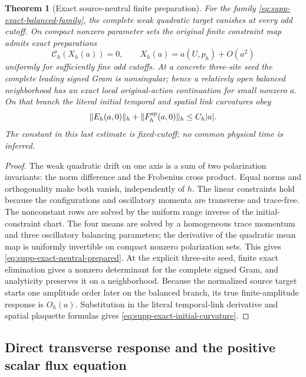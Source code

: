 \documentclass[11pt]{article}
\newtheorem{theorem}{Theorem}[section]
\numberwithin{equation}{section}
\theoremstyle{definition}
\theoremstyle{remark}
\begin{document}
\begin{theorem}[Exact source-neutral finite preparation]
\label{thm:supp-exact-neutral-preparation}
For the family \eqref{eq:supp-exact-balanced-family}, the complete weak
quadratic target vanishes at every odd cutoff.  On compact nonzero parameter
sets the original finite constraint map admits exact preparations
\begin{equation}
 \mathscr C_h(X_h(a))=0,
 \qquad X_h(a)=a(U,p_h)+O(a^2)
 \label{eq:supp-exact-neutral-prepared}
\end{equation}
uniformly for sufficiently fine odd cutoffs.  At a concrete three-site seed
the complete leading signed Gram is nonsingular; hence a relatively open
balanced neighborhood has an exact local original-action continuation for
small nonzero $a$.  On that branch the literal initial temporal and spatial
link curvatures obey
\begin{equation}
 \|E_h(a,0)\|_h+\|F_h^{\rm sp}(a,0)\|_h\le C_h|a|.
 \label{eq:supp-exact-initial-curvature}
\end{equation}
The constant in this last estimate is fixed-cutoff; no common physical time
is inferred.
\end{theorem}
\begin{proof}
The weak quadratic drift on one axis is a sum of two polarization invariants:
the norm difference and the Frobenius cross product.  Equal norms and
orthogonality make both vanish, independently of $h$.  The linear constraints
hold because the configurations and oscillatory momenta are transverse and
trace-free.  The nonconstant rows are solved by the uniform range inverse of
the initial-constraint chart.  The four means are solved by a homogeneous
trace momentum and three oscillatory balancing parameters; the derivative of
the quadratic mean map is uniformly invertible on compact nonzero
polarization sets.  This gives \eqref{eq:supp-exact-neutral-prepared}.  At the
explicit three-site seed, finite exact elimination gives a nonzero determinant
for the complete signed Gram, and analyticity preserves it on a neighborhood.
Because the normalized source target starts one amplitude order later on the
balanced branch, its true finite-amplitude response is $O_h(a)$.  Substitution
in the literal temporal-link derivative and spatial plaquette formulas gives
\eqref{eq:supp-exact-initial-curvature}.
\end{proof}

\subsection{Direct transverse response and the positive scalar flux equation}
\end{document}
